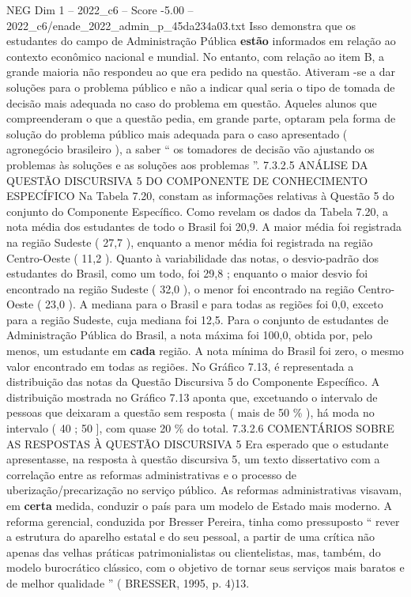 \begin{textsample}{NEG Dim 1 – 2022\_c6 – Score -5.00 – 2022\_c6/enade\_2022\_admin\_p\_45da234a03.txt}
Isso demonstra que os estudantes do campo de Administração Pública \textbf{estão} informados em relação ao contexto econômico nacional e mundial.
No entanto, com relação ao item B, a grande maioria não respondeu ao que era pedido na questão.
Ativeram -se a dar soluções para o problema público e não a indicar qual seria o tipo de tomada de decisão mais adequada no caso do problema em questão.
Aqueles alunos que compreenderam o que a questão pedia, em grande parte, optaram pela forma de solução do problema público mais adequada para o caso apresentado ( agronegócio brasileiro ), a saber “ os tomadores de decisão vão ajustando os problemas às soluções e as soluções aos problemas ”. 7.3.2.5 ANÁLISE DA QUESTÃO DISCURSIVA 5 DO COMPONENTE DE CONHECIMENTO ESPECÍFICO Na Tabela 7.20, constam as informações relativas à Questão 5 do conjunto do Componente Específico.
Como revelam os dados da Tabela 7.20, a nota média dos estudantes de todo o Brasil foi 20,9.
A maior média foi registrada na região Sudeste ( 27,7 ), enquanto a menor média foi registrada na região Centro-Oeste ( 11,2 ).
Quanto à variabilidade das notas, o desvio-padrão dos estudantes do Brasil, como um todo, foi 29,8 ; enquanto o maior desvio foi encontrado na região Sudeste ( 32,0 ), o menor foi encontrado na região Centro-Oeste ( 23,0 ).
A mediana para o Brasil e para todas as regiões foi 0,0, exceto para a região Sudeste, cuja mediana foi 12,5.
Para o conjunto de estudantes de Administração Pública do Brasil, a nota máxima foi 100,0, obtida por, pelo menos, um estudante em \textbf{cada} região.
A nota mínima do Brasil foi zero, o mesmo valor encontrado em todas as regiões.
No Gráfico 7.13, é representada a distribuição das notas da Questão Discursiva 5 do Componente Específico.
A distribuição mostrada no Gráfico 7.13 aponta que, excetuando o intervalo de pessoas que deixaram a questão sem resposta ( mais de 50 \% ), há moda no intervalo ( 40 ; 50 ], com quase 20 \% do total. 7.3.2.6 COMENTÁRIOS SOBRE AS RESPOSTAS À QUESTÃO DISCURSIVA 5 Era esperado que o estudante apresentasse, na resposta à questão discursiva 5, um texto dissertativo com a correlação entre as reformas administrativas e o processo de uberização/precarização no serviço público.
As reformas administrativas visavam, em \textbf{certa} medida, conduzir o país para um modelo de Estado mais moderno.
A reforma gerencial, conduzida por Bresser Pereira, tinha como pressuposto “ rever a estrutura do aparelho estatal e do seu pessoal, a partir de uma crítica não apenas das velhas práticas patrimonialistas ou clientelistas, mas, também, do modelo burocrático clássico, com o objetivo de tornar seus serviços mais baratos e de melhor qualidade ” ( BRESSER, 1995, p. 4)13.

\end{textsample}
